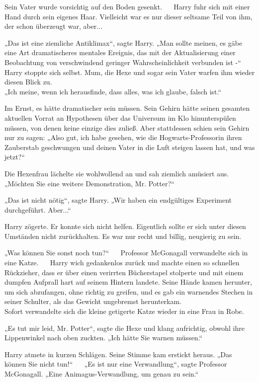 {Sein Vater wurde vorsichtig auf den Boden gesenkt. ~ ~Harry fuhr sich mit einer Hand durch sein eigenes Haar. Vielleicht war es nur dieser seltsame Teil von ihm, der schon überzeugt war, aber...

„Das ist eine ziemliche Antiklimax“, sagte Harry. „Man sollte meinen, es gäbe eine Art dramatischeres mentales Ereignis, das mit der Aktualisierung einer Beobachtung von verschwindend geringer Wahrscheinlichkeit verbunden ist -“\\ Harry stoppte sich selbst. Mum, die Hexe und sogar sein Vater warfen ihm wieder diesen Blick zu.\\ „Ich meine, wenn ich herausfinde, dass alles, was ich glaube, falsch ist.“ ~ ~

Im Ernst, es hätte dramatischer sein müssen. Sein Gehirn hätte seinen gesamten aktuellen Vorrat an Hypothesen über das Universum im Klo hinunterspülen müssen, von denen keine einzige dies zuließ. Aber stattdessen schien sein Gehirn nur zu sagen: „Also gut, ich habe gesehen, wie die Hogwarts-Professorin ihren Zauberstab geschwungen und deinen Vater in die Luft steigen lassen hat, und was jetzt?“ ~ ~

Die Hexenfrau lächelte sie wohlwollend an und sah ziemlich amüsiert aus. „Möchten Sie eine weitere Demonstration, Mr. Potter?“ ~ ~

„Das ist nicht nötig“, sagte Harry. „Wir haben ein endgültiges Experiment durchgeführt. Aber...“

Harry zögerte. Er konnte sich nicht helfen. Eigentlich sollte er sich unter diesen Umständen nicht zurückhalten. Es war nur recht und billig, neugierig zu sein.

„Was können Sie sonst noch tun?“ ~ ~Professor McGonagall verwandelte sich in eine Katze. ~ ~Harry wich gedankenlos zurück und machte einen so schnellen Rückzieher, dass er über einen verirrten Bücherstapel stolperte und mit einem dumpfen Aufprall hart auf seinem Hintern landete. Seine Hände kamen herunter, um sich abzufangen, ohne richtig zu greifen, und es gab ein warnendes Stechen in seiner Schulter, als das Gewicht ungebremst herunterkam. ~ ~\\ Sofort verwandelte sich die kleine getigerte Katze wieder in eine Frau in Robe.

„Es tut mir leid, Mr. Potter“, sagte die Hexe und klang aufrichtig, obwohl ihre Lippenwinkel nach oben zuckten. „Ich hätte Sie warnen müssen.“ ~ ~

Harry atmete in kurzen Schlägen. Seine Stimme kam erstickt heraus. „Das können Sie nicht tun!“ ~ ~„Es ist nur eine Verwandlung“, sagte Professor McGonagall. „Eine Animagus-Verwandlung, um genau zu sein.“ ~ ~

}
